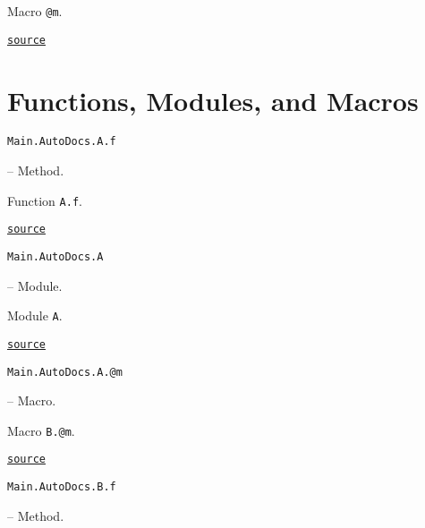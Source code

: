 \begin{adjustwidth}{2em}{0pt}

Macro \texttt{@m}.



\href{https://github.com/BambOoxX/Documenter.jl/blob/d157febde213549ed0d45c894f0651560da477d3/test/examples/make.jl#L95}{\texttt{source}}


\end{adjustwidth}

\section{Functions, Modules, and Macros}



\label{3338605747262022226}{}

\hypertarget{8047994080897963665}{\texttt{Main.AutoDocs.A.f}}  -- {Method.}

\begin{adjustwidth}{2em}{0pt}

Function \texttt{A.f}.



\href{https://github.com/BambOoxX/Documenter.jl/blob/d157febde213549ed0d45c894f0651560da477d3/test/examples/make.jl#L100}{\texttt{source}}


\end{adjustwidth}
\hypertarget{14171230956575570013}{\texttt{Main.AutoDocs.A}}  -- {Module.}

\begin{adjustwidth}{2em}{0pt}

Module \texttt{A}.



\href{https://github.com/BambOoxX/Documenter.jl/blob/d157febde213549ed0d45c894f0651560da477d3/test/examples/make.jl#L98}{\texttt{source}}


\end{adjustwidth}
\hypertarget{1819148365468180190}{\texttt{Main.AutoDocs.A.@m}}  -- {Macro.}

\begin{adjustwidth}{2em}{0pt}

Macro \texttt{B.@m}.



\href{https://github.com/BambOoxX/Documenter.jl/blob/d157febde213549ed0d45c894f0651560da477d3/test/examples/make.jl#L109}{\texttt{source}}


\end{adjustwidth}
\hypertarget{1354818346142581698}{\texttt{Main.AutoDocs.B.f}}  -- {Method.}


